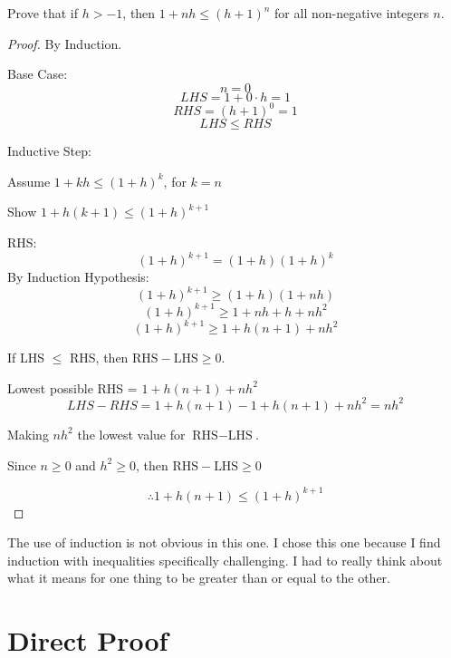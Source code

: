 \documentclass[12pt]{article}
\begin{document}
\begin{flushleft}
Prove that if $h > -1$, then $1 + nh \leq (h+1)^n$ for all non-negative integers $n$.
\end{flushleft}
\begin{proof}
By Induction.

Base Case:
$$n = 0$$
$$LHS = 1 + 0\cdot h = 1$$
$$RHS = (h+1)^0 = 1$$
$$LHS \leq RHS$$

Inductive Step:

Assume $1 + kh \leq (1+h)^k$, for $k = n$

Show $1 + h(k + 1) \leq (1+h)^{k+1}$

RHS:
$$(1+h)^{k+1} = (1+h)(1+h)^k$$
By Induction Hypothesis:
$$(1+h)^{k+1} \geq (1+h)(1+nh)$$
$$(1+h)^{k+1} \geq 1+nh+h+nh^2$$
$$(1+h)^{k+1} \geq 1+h(n+1)+nh^2$$

If LHS $\leq$ RHS, then $\text{RHS} - \text{LHS} \geq 0$. 

Lowest possible RHS = $1+h(n+1)+nh^2$
$$LHS - RHS = 1 + h(n + 1) - 1+h(n+1)+nh^2 = nh^2$$

Making $nh^2$ the lowest value for $\text{RHS} - \text{LHS}$.

Since $n \geq 0$ and $h^2 \geq 0$, then  $\text{RHS} - \text{LHS} \geq 0$


$$\therefore 1 + h(n + 1) \leq (1+h)^{k+1}$$

\end{proof}

\par
The use of induction is not obvious in this one. I chose this one because I find induction with inequalities specifically challenging. I had to really think about what it means for one thing to be greater than or equal to the other. 

\newpage
\section{Direct Proof}
\end{document}
